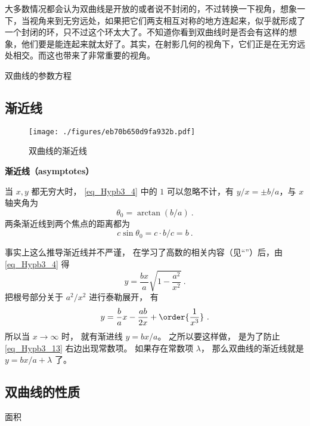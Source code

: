 大多数情况都会认为双曲线是开放的或者说不封闭的，不过转换一下视角，想象一下，当视角来到无穷远处，如果把它们两支相互对称的地方连起来，似乎就形成了一个封闭的环，只不过这个环太大了。不知道你看到双曲线时是否会有这样的想象，他们要是能连起来就太好了。其实，在射影几何的视角下，它们正是在无穷远处相交。而这也带来了非常重要的视角。

\begin{theorem}{双曲线的参数方程}

\end{theorem}

\subsection{渐近线}
\begin{figure}[ht]
\centering
\texttt{[image: ./figures/eb70b650d9fa932b.pdf]}
\caption{双曲线的渐近线} \label{fig_Hypb3_1}
\end{figure}
\textbf{渐近线（asymptotes）}

当 $x,y$ 都无穷大时， \autoref{eq_Hypb3_4} 中的 $1$ 可以忽略不计，有 $y/x = \pm b/a$，与 $x$ 轴夹角为
\begin{equation}\label{eq_Hypb3_1}
\theta_0 = \arctan(b/a)~.
\end{equation}
两条渐近线到两个焦点的距离都为
\begin{equation}\label{eq_Hypb3_11}
c\sin\theta_0 = c\cdot b/c = b~.
\end{equation}


事实上这么推导渐近线并不严谨， 在学习了高数的相关内容（见“”）后，由\autoref{eq_Hypb3_4} 得
\begin{equation}
y = \frac{bx}{a} \sqrt{1-\frac{a^2}{x^2}}~.
\end{equation}
把根号部分关于 $a^2/x^2$ 进行泰勒展开， 有
\begin{equation}\label{eq_Hypb3_13}
y = \frac ba x - \frac{ab}{2x} + \order{\frac{1}{x^3}}~.
\end{equation}
所以当 $x\to\infty$ 时， 就有渐进线 $y = bx/a$。 之所以要这样做， 是为了防止\autoref{eq_Hypb3_13} 右边出现常数项。 如果存在常数项 $\lambda$， 那么双曲线的渐近线就是 $y = bx/a + \lambda$ 了。

\subsection{双曲线的性质}
面积









